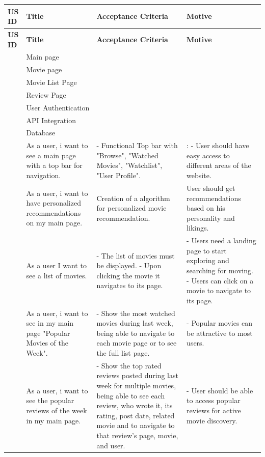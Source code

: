 \documentclass{article}
\begin{document}
\renewcommand{\arraystretch}{1.2}
\setlength{\tabcolsep}{6pt}


\small %

\begin{longtable}{|p{1cm}|p{3cm}|p{6cm}|p{6cm}|}
\hline
\textbf{US ID} & \textbf{Title} & \textbf{Acceptance Criteria} & \textbf{Motive} \\ \hline
\endfirsthead
\hline
\textbf{US ID} & \textbf{Title} & \textbf{Acceptance Criteria} & \textbf{Motive} \\ \hline
\endhead
[US1] & Main page &  &  \\ \hline
[US2] & Movie page &  &  \\ \hline
[US3] & Movie List Page &  &  \\ \hline
[US4] & Review Page &  &  \\ \hline
[US5] & User Authentication &  &  \\ \hline
[US6] & API Integration &  &  \\ \hline
[US7] & Database &  &  \\ \hline
[US1.2] & As a user, i want to see a main page with a top bar for navigation. & - Functional Top bar with "Browse", "Watched Movies", "Watchlist", "User Profile". & : - User should have easy access to different areas of the website. \\ \hline
[US1.3] & As a user, i want to have personalized recommendations on my main page. & Creation of a algorithm for personalized movie recommendation. & User should get recommendations based on his personality and likings. \\ \hline
[US3.1] & As a user I want to see a list of movies. & - The list of movies must be displayed. - Upon clicking the movie it navigates to its page. & - Users need a landing page to start exploring and searching for moving. - Users can click on a movie to navigate to its page. \\ \hline
[US1.4] & As a user, i want to see in my main page "Popular Movies of the Week". & - Show the most watched movies during last week, being able to navigate to each movie page or to see the full list page. & - Popular movies can be attractive to most users. \\ \hline
[US1.5] & As a user, i want to see the popular reviews of the week in my main page. & - Show the top rated reviews posted during last week for multiple movies, being able to see each review, who wrote it, its rating, post date, related movie and to navigate to that review's page, movie, and user. & - User should be able to access popular reviews for active movie discovery. \\ \hline

\end{longtable}
\end{document}
